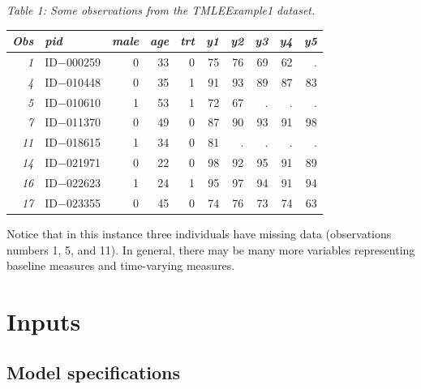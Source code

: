 \documentclass[10pt]{article}
\renewcommand{\baselinestretch}{1.3}
\begin{document}
\hspace{0.6in}\begin{minipage}[t]{6.8in}
{\renewcommand{\baselinestretch}{1.1}\selectfont%
\begin{minipage}[t]{5.6in}
{\normalsize \em Table 1:  Some observations from the TMLEExample1 dataset.}
\end{minipage}}\vspace{-0.01in}

{\renewcommand{\baselinestretch}{1.1}\selectfont\normalsize\selectfont%
\begin{tabular}{|r|l|r|r|r|r|r|r|r|r|}\hline
\em    Obs & \em    pid & \em    male & \em    age & \em    trt & \em    y1 & \em    y2 & \em    y3 & \em    y4 & \em    y5\\\hline
\em      1 &    ID$-$000259 &    0 &    33 &    0 &    75 &    76 &    69 &    62 &     .\\\hline
\em      4 &    ID$-$010448 &    0 &    35 &    1 &    91 &    93 &    89 &    87 &    83\\\hline
\em      5 &    ID$-$010610 &    1 &    53 &    1 &    72 &    67 &     . &     . &     .\\\hline
\em      7 &    ID$-$011370 &    0 &    49 &    0 &    87 &    90 &    93 &    91 &    98\\\hline
\em     11 &    ID$-$018615 &    1 &    34 &    0 &    81 &     . &     . &     . &     .\\\hline
\em     14 &    ID$-$021971 &    0 &    22 &    0 &    98 &    92 &    95 &    91 &    89\\\hline
\em     16 &    ID$-$022623 &    1 &    24 &    1 &    95 &    97 &    94 &    91 &    94\\\hline
\em     17 &    ID$-$023355 &    0 &    45 &    0 &    74 &    76 &    73 &    74 &    63\\\hline
\end{tabular}
}
\end{minipage}
\vspace{0.3in}

Notice that in this instance three individuals have missing data (observations numbers 1, 5, and 11).  In general, there may be many more variables representing baseline measures and time-varying measures.

\section*{Inputs}

\subsection*{Model specifications}
\end{document}
